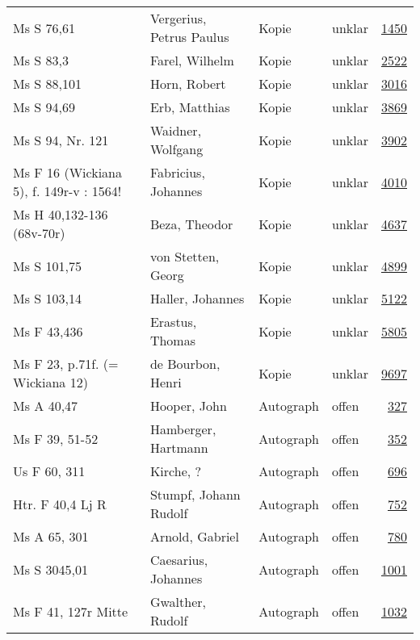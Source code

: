 \documentclass[10pt,a4paper,landscape]{report}
\begin{document}
\begin{longtable}{p{16cm}p{4cm}llr}
Ms S 76,61	&	Vergerius, Petrus Paulus	&	Kopie	&	unklar	&	\href{http://130.60.24.72/assignment/1450}{1450}\\
Ms S 83,3	&	Farel, Wilhelm	&	Kopie	&	unklar	&	\href{http://130.60.24.72/assignment/2522}{2522}\\
Ms S 88,101	&	Horn, Robert	&	Kopie	&	unklar	&	\href{http://130.60.24.72/assignment/3016}{3016}\\
Ms S 94,69	&	Erb, Matthias	&	Kopie	&	unklar	&	\href{http://130.60.24.72/assignment/3869}{3869}\\
Ms S 94, Nr. 121	&	Waidner, Wolfgang	&	Kopie	&	unklar	&	\href{http://130.60.24.72/assignment/3902}{3902}\\
Ms F 16 (Wickiana 5), f. 149r-v : 1564!	&	Fabricius, Johannes	&	Kopie	&	unklar	&	\href{http://130.60.24.72/assignment/4010}{4010}\\
Ms H 40,132-136 (68v-70r)	&	Beza, Theodor	&	Kopie	&	unklar	&	\href{http://130.60.24.72/assignment/4637}{4637}\\
Ms S 101,75	&	von Stetten, Georg	&	Kopie	&	unklar	&	\href{http://130.60.24.72/assignment/4899}{4899}\\
Ms S 103,14	&	Haller, Johannes	&	Kopie	&	unklar	&	\href{http://130.60.24.72/assignment/5122}{5122}\\
Ms F 43,436	&	Erastus, Thomas	&	Kopie	&	unklar	&	\href{http://130.60.24.72/assignment/5805}{5805}\\
Ms F 23, p.71f. (= Wickiana 12)	&	de Bourbon, Henri	&	Kopie	&	unklar	&	\href{http://130.60.24.72/assignment/9697}{9697}\\
Ms A 40,47	&	Hooper, John	&	Autograph	&	offen	&	\href{http://130.60.24.72/assignment/327}{327}\\
Ms F 39, 51-52	&	Hamberger, Hartmann	&	Autograph	&	offen	&	\href{http://130.60.24.72/assignment/352}{352}\\
Us F 60, 311	&	Kirche, ?	&	Autograph	&	offen	&	\href{http://130.60.24.72/assignment/696}{696}\\
Htr. F 40,4 Lj R	&	Stumpf, Johann Rudolf	&	Autograph	&	offen	&	\href{http://130.60.24.72/assignment/752}{752}\\
Ms A 65, 301	&	Arnold, Gabriel	&	Autograph	&	offen	&	\href{http://130.60.24.72/assignment/780}{780}\\
Ms S 3045,01	&	Caesarius, Johannes	&	Autograph	&	offen	&	\href{http://130.60.24.72/assignment/1001}{1001}\\
Ms F 41, 127r Mitte	&	Gwalther, Rudolf	&	Autograph	&	offen	&	\href{http://130.60.24.72/assignment/1032}{1032}\\

\end{longtable}
\end{document}
